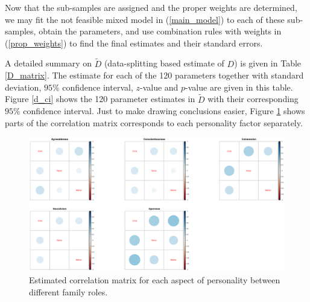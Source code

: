 \documentclass[11pt,a5paper,twoside]{book}
\begin{document}
Now that the sub-samples are assigned and the proper weights are determined, we may fit the not feasible mixed model in (\ref{main_model}) to each of these sub-samples, obtain the parameters, and use combination rules with weights in (\ref{prop_weights}) to find the final estimates and their standard errors.

A detailed summary on $\tilde{D}$ (data-splitting based estimate of $D$) is given in Table \ref{D_matrix}. The estimate for each of the 120 parameters together with standard deviation, $95\%$ confidence interval, $z$-value and $p$-value are given in this table. Figure \ref{d_ci} shows the 120 parameter estimates in $\tilde{D}$ with their corresponding $95\%$ confidence interval. Just to make drawing conclusions easier, Figure \ref{corr_sep} shows parts of the correlation matrix corresponds to each personality factor separately.



\begin{figure}
\centering
\includegraphics[width=\textwidth]{cor_separate.eps}
\caption{Estimated correlation matrix for each aspect of personality between different family roles.} \label{corr_sep}
\end{figure} 
\end{document}
